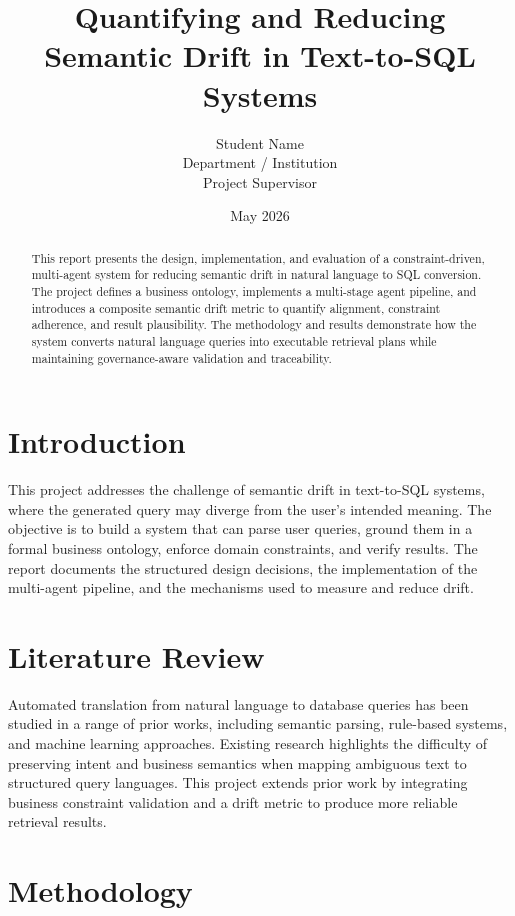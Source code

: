 \documentclass[12pt,a4paper]{article}
\title{Quantifying and Reducing Semantic Drift in Text-to-SQL Systems}
\author{Student Name \\ Department / Institution \\ Project Supervisor}
\date{May 2026}
\begin{document}
\maketitle
\thispagestyle{empty}
\clearpage

\begin{abstract}
This report presents the design, implementation, and evaluation of a constraint-driven, multi-agent system for reducing semantic drift in natural language to SQL conversion. The project defines a business ontology, implements a multi-stage agent pipeline, and introduces a composite semantic drift metric to quantify alignment, constraint adherence, and result plausibility. The methodology and results demonstrate how the system converts natural language queries into executable retrieval plans while maintaining governance-aware validation and traceability.
\end{abstract}

\clearpage
\tableofcontents
\listoffigures
\listoftables
\clearpage

\section{Introduction}
This project addresses the challenge of semantic drift in text-to-SQL systems, where the generated query may diverge from the user's intended meaning. The objective is to build a system that can parse user queries, ground them in a formal business ontology, enforce domain constraints, and verify results. The report documents the structured design decisions, the implementation of the multi-agent pipeline, and the mechanisms used to measure and reduce drift.

\section{Literature Review}
Automated translation from natural language to database queries has been studied in a range of prior works, including semantic parsing, rule-based systems, and machine learning approaches. Existing research highlights the difficulty of preserving intent and business semantics when mapping ambiguous text to structured query languages. This project extends prior work by integrating business constraint validation and a drift metric to produce more reliable retrieval results.

\section{Methodology}
\end{document}
